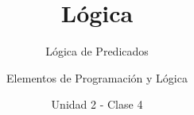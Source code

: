 \documentclass[usenames,dvipsnames]{../../common/beamerUNQaccessible}
\title{Lógica}
\subtitle{Lógica de Predicados}
\author{Elementos de Programación y Lógica}
\date{Unidad 2 - Clase 4}
\begin{document}
  \titleframe
  \toc
  
  \finaltitleframe
\end{document}
